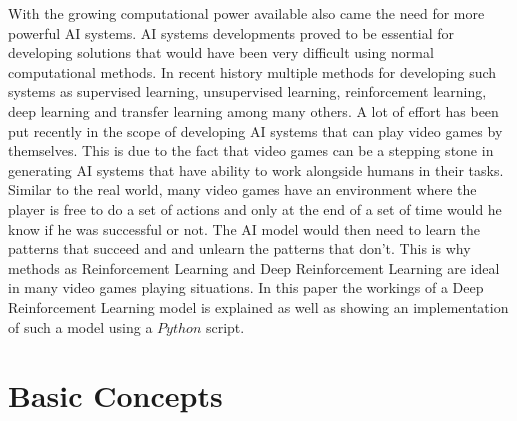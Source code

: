 \documentclass[conference]{IEEEtran}
\begin{document}
With the growing computational power available also came the need for more powerful AI systems. AI systems developments proved to be essential for developing solutions that would have been very difficult using normal computational methods. In recent history multiple methods for developing such systems as supervised learning, unsupervised learning, reinforcement learning, deep learning and transfer learning among many others. A lot of effort has been put recently in the scope of developing AI systems that can play video games by themselves. This is due to the fact that video games can be a stepping stone in generating AI systems that have ability to work alongside humans in their tasks. Similar to the real world, many video games have an environment where the player is free to do a set of actions and only at the end of a set of time would he know if he was successful or not. The AI model would then need to learn the patterns that succeed and and unlearn the patterns that don't. This is why methods as Reinforcement Learning and Deep Reinforcement Learning are ideal in many video games playing situations. In this paper the workings of a Deep Reinforcement Learning model is explained as well as showing an implementation of such a model using a $Python$ script.
\section{Basic Concepts}
\end{document}
